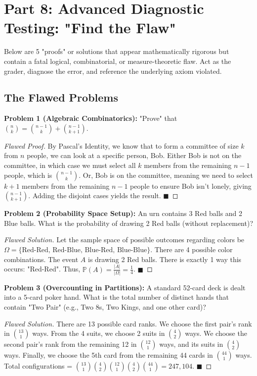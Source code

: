 \documentclass[11pt]{article}
\theoremstyle{definition}
\theoremstyle{plain}
\theoremstyle{remark}
\newcommand{\Prob}{\mathbb{P}}
\newcommand{\sample}{\Omega}
\begin{document}
\section{Part 8: Advanced Diagnostic Testing: "Find the Flaw"}
Below are 5 "proofs" or solutions that appear mathematically rigorous but contain a fatal logical, combinatorial, or measure-theoretic flaw. Act as the grader, diagnose the error, and reference the underlying axiom violated.

\subsection{The Flawed Problems}
\textbf{Problem 1 (Algebraic Combinatorics):} "Prove" that $\binom{n}{k} = \binom{n-1}{k} + \binom{n-1}{k+1}$.
\begin{proof}[Flawed Proof]
By Pascal's Identity, we know that to form a committee of size $k$ from $n$ people, we can look at a specific person, Bob. Either Bob is not on the committee, in which case we must select all $k$ members from the remaining $n-1$ people, which is $\binom{n-1}{k}$. Or, Bob is on the committee, meaning we need to select $k+1$ members from the remaining $n-1$ people to ensure Bob isn't lonely, giving $\binom{n-1}{k+1}$. Adding the disjoint cases yields the result. $\blacksquare$
\end{proof}

\textbf{Problem 2 (Probability Space Setup):} An urn contains 3 Red balls and 2 Blue balls. What is the probability of drawing 2 Red balls (without replacement)?
\begin{proof}[Flawed Solution]
Let the sample space of possible outcomes regarding colors be $\sample = \{\text{Red-Red, Red-Blue, Blue-Red, Blue-Blue}\}$. There are 4 possible color combinations. The event $A$ is drawing 2 Red balls. There is exactly 1 way this occurs: "Red-Red". Thus, $\Prob(A) = \frac{|A|}{|\sample|} = \frac{1}{4}$. $\blacksquare$
\end{proof}

\textbf{Problem 3 (Overcounting in Partitions):} A standard 52-card deck is dealt into a 5-card poker hand. What is the total number of distinct hands that contain "Two Pair" (e.g., Two 8s, Two Kings, and one other card)?
\begin{proof}[Flawed Solution]
There are 13 possible card ranks. We choose the first pair's rank in $\binom{13}{1}$ ways. From the 4 suits, we choose 2 suits in $\binom{4}{2}$ ways. We choose the second pair's rank from the remaining 12 in $\binom{12}{1}$ ways, and its suits in $\binom{4}{2}$ ways. Finally, we choose the 5th card from the remaining 44 cards in $\binom{44}{1}$ ways. 
Total configurations = $\binom{13}{1} \binom{4}{2} \binom{12}{1} \binom{4}{2} \binom{44}{1} = 247,104$. $\blacksquare$
\end{proof}
\end{document}
